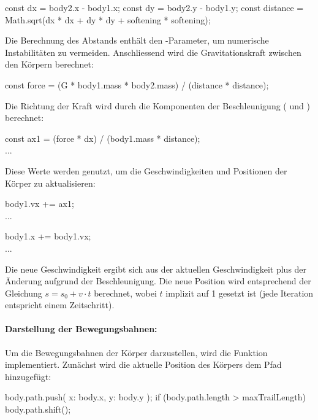 \documentclass[a4paper,12pt,twoside]{article}
\begin{document}
\begin{javascript}
const dx = body2.x - body1.x;
const dy = body2.y - body1.y;
const distance = Math.sqrt(dx * dx + dy * dy + softening * softening);
\end{javascript}

Die Berechnung des Abstands  enthält 
den -Parameter, um numerische Instabilitäten 
zu vermeiden. Anschliessend wird die Gravitationskraft zwischen den Körpern berechnet:

\begin{javascript}
const force = (G * body1.mass * body2.mass) / (distance * distance);
\end{javascript}

Die Richtung der Kraft wird durch die Komponenten der 
Beschleunigung ( und ) berechnet:

\begin{javascript}
const ax1 = (force * dx) / (body1.mass * distance);
\\...
\end{javascript}

Diese Werte werden genutzt, um die Geschwindigkeiten und Positionen 
der Körper zu aktualisieren:

\begin{javascript}
body1.vx += ax1;
\\...

body1.x += body1.vx;
\\...
\end{javascript}

Die neue Geschwindigkeit ergibt sich aus der aktuellen Geschwindigkeit plus 
der Änderung aufgrund der Beschleunigung. Die neue Position wird entsprechend 
der Gleichung \( s = s_0 + v \cdot t \) berechnet, wobei \( t \) implizit auf 1 
gesetzt ist (jede Iteration entspricht einem Zeitschritt).

\paragraph{Darstellung der Bewegungsbahnen:}
Um die Bewegungsbahnen der Körper darzustellen, wird die Funktion  
implementiert. Zunächst wird die aktuelle Position des Körpers dem Pfad hinzugefügt:

\begin{javascript}
body.path.push({ x: body.x, y: body.y });
if (body.path.length > maxTrailLength) body.path.shift();
\end{javascript}
\end{document}
